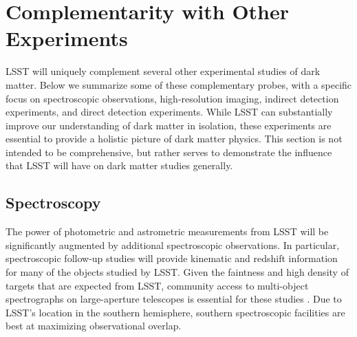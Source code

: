 \chapter{Complementarity with Other Experiments}
\label{sec:complementarity}
\bigskip

LSST will uniquely complement several other experimental studies of dark matter.
Below we summarize some of these complementary probes, with a specific focus on spectroscopic observations, high-resolution imaging, indirect detection experiments, and direct detection experiments.
While LSST can substantially improve our understanding of dark matter in isolation, these experiments are essential to provide a holistic picture of dark matter physics.
This section is not intended to be comprehensive, but rather serves to demonstrate the influence that LSST will have on dark matter studies generally.

\section{Spectroscopy }
 \label{sec:spectroscopy}

The power of photometric and astrometric measurements from LSST will be significantly augmented by additional spectroscopic observations.
In particular, spectroscopic follow-up studies will provide kinematic and redshift information for many of the objects studied by LSST.
Given the faintness and high density of targets that are expected from LSST, community access to multi-object spectrographs on large-aperture telescopes is essential for these studies \citep{2016arXiv161001661N}. 
Due to LSST's location in the southern hemisphere, southern spectroscopic facilities are best at maximizing observational overlap.


